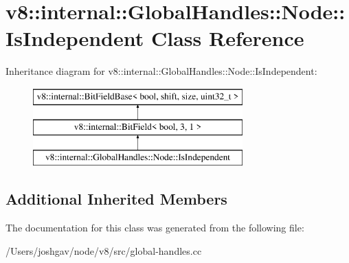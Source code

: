 \hypertarget{classv8_1_1internal_1_1_global_handles_1_1_node_1_1_is_independent}{}\section{v8\+:\+:internal\+:\+:Global\+Handles\+:\+:Node\+:\+:Is\+Independent Class Reference}
\label{classv8_1_1internal_1_1_global_handles_1_1_node_1_1_is_independent}
Inheritance diagram for v8\+:\+:internal\+:\+:Global\+Handles\+:\+:Node\+:\+:Is\+Independent\+:\begin{figure}[H]
\begin{center}
\leavevmode
\includegraphics[height=3.000000cm]{classv8_1_1internal_1_1_global_handles_1_1_node_1_1_is_independent}
\end{center}
\end{figure}
\subsection*{Additional Inherited Members}


The documentation for this class was generated from the following file\+:\begin{DoxyCompactItemize}
\item 
/\+Users/joshgav/node/v8/src/global-\/handles.\+cc\end{DoxyCompactItemize}
